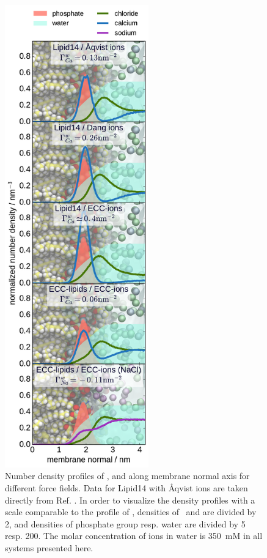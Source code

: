 \documentclass[aip,jcp,twocolumn]{revtex4}
\begin{document}
\begin{figure}[tbp]
  \centering
  \includegraphics[height=20.0cm]{../Fig/ipython_nb/density_profiles_ca_cl_wat_phos_models-compar.pdf}
  \caption{\label{fig:cacl-dens}
    Number density profiles of ,  and  along membrane normal axis
    for different force fields. Data for Lipid14 with \AA{}qvist ions are taken directly from Ref. .
    In order to visualize the density profiles with a scale comparable to the profile of , 
    densities of~ and  are divided by 2, and
    densities of phosphate group resp. water are divided by 5 resp. 200. 
    The molar concentration of ions in water is 350~mM in all systems
    presented here. 
    }
\end{figure}
\end{document}
